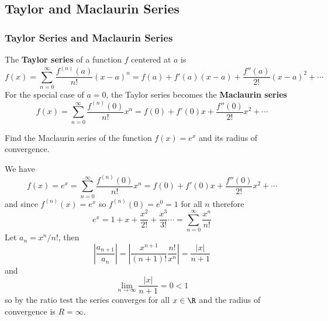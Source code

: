 \subsection{Taylor and Maclaurin Series}

\subsubsection*{Taylor Series and Maclaurin Series}
The \textbf{Taylor series} of a function \(f\) centered at \(a\) is
\[f(x)=\sum_{n=0}^{\infty}\frac{f^{(n)}(a)}{n!}(x-a)^n
=f(a)+f'(a)(x-a)+\frac{f''(a)}{2!}(x-a)^2+\cdots\]
For the special case of \(a=0\), the Taylor series becomes the
\textbf{Maclaurin series}
\[f(x)=\sum_{n=0}^{\infty}\frac{f^{(n)}(0)}{n!}x^n
=f(0)+f'(0)x+\frac{f''(0)}{2!}x^2+\cdots\]
\begin{problem}
    Find the Maclaurin series of the function \(f(x)=e^x\) and its radius of
    convergence.
\end{problem}
\begin{solution}
    We have
    \[f(x)=e^x=\sum_{n=0}^{\infty}\frac{f^{(n)}(0)}{n!}x^n
    =f(0)+f'(0)x+\frac{f''(0)}{2!}x^2+\cdots\]
    and since \(f^{(n)}(x)=e^x\) so \(f^{(n)}(0)=e^0=1\) for all \(n\)
    therefore
    \[e^x=1+x+\frac{x^2}{2!}+\frac{x^3}{3!}\cdots
    =\sum_{n=0}^\infty\frac{x^n}{n!}\]
    Let \(a_n=x^n/n!\), then
    \[\left|\frac{a_{n+1}}{a_n}\right|
    =\left|\frac{x^{n+1}}{(n+1)!}\frac{n!}{x^n}\right|=\frac{|x|}{n+1}\]
    and
    \[\lim_{n\to\infty}\frac{|x|}{n+1}=0<1\]
    so by the ratio test the series converges for all \(x\in\R\) and the
    radius of convergence is \(R=\infty\).
\end{solution}

